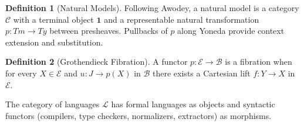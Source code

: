 \documentclass{article}
\theoremstyle{definition}
\newtheorem{definition}{Definition}[section]
\theoremstyle{plain}
\begin{document}
\begin{definition}[Natural Models]
Following Awodey, a natural model is a category $\mathcal{C}$ with a terminal
object $\mathbf{1}$ and a representable natural transformation $p : Tm \to Ty$ between presheaves.
Pullbacks of $p$ along Yoneda provide context extension and substitution.
\end{definition}

\begin{definition}[Grothendieck Fibration]
A functor $p : \mathcal{E} \to \mathcal{B}$ is a fibration when for every
$X \in \mathcal{E}$ and $u : J \to p(X)$ in $\mathcal{B}$ there exists a
Cartesian lift $f : Y \to X$ in $\mathcal{E}$.
\end{definition}

The category of languages $\mathcal{L}$ has formal languages as objects and
syntactic functors (compilers, type checkers, normalizers, extractors) as
morphisms.
\end{document}
